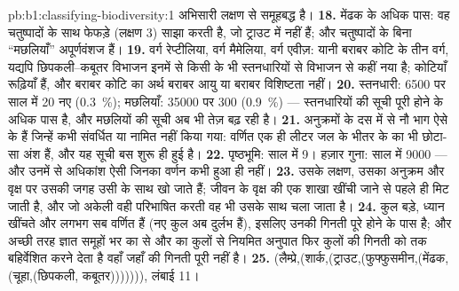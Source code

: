 \begin{solution}{pb:b1:classifying-biodiversity:1}
अभिसारी लक्षण से समूहबद्ध है।
\textbf{18.} मेंढक के अधिक पास: वह चतुष्पादों के साथ फेफड़े (लक्षण 3)
साझा करती है, जो ट्राउट में नहीं हैं; और चतुष्पादों के बिना ``मछलियाँ''
अपूर्णवंशज हैं।
\textbf{19.} वर्ग रेप्टीलिया, वर्ग मैमेलिया, वर्ग एवीज़: यानी बराबर कोटि
के तीन वर्ग, यद्यपि छिपकली--कबूतर विभाजन इनमें से किसी के भी स्तनधारियों
से विभाजन से कहीं नया है; कोटियाँ रूढ़ियाँ हैं, और
बराबर कोटि का अर्थ बराबर आयु या बराबर विशिष्टता नहीं।
\textbf{20.} स्तनधारी: \num{6500} पर साल में \num{20} नए (\qty{0.3}{\%});
मछलियाँ: \num{35000} पर \num{300} (\qty{0.9}{\%}) --- स्तनधारियों की
सूची पूरी होने के अधिक पास है, और मछलियों की सूची अब भी तेज़
बढ़ रही है।
\textbf{21.} अनुक्रमों के दस में से नौ भाग ऐसे  के हैं जिन्हें कभी
संवर्धित या नामित नहीं किया गया: वर्णित  एक ही लीटर जल के
भीतर के  का भी छोटा-सा अंश हैं, और यह सूची बस शुरू ही हुई है।
\textbf{22.} पृष्ठभूमि: साल में \num{9}। हज़ार गुना: साल में \num{9000}
--- और उनमें से अधिकांश ऐसी  जिनका वर्णन कभी हुआ ही नहीं।
\textbf{23.} उसके लक्षण, उसका अनुक्रम और वृक्ष पर उसकी जगह उसी के साथ
खो जाते हैं; जीवन के वृक्ष की एक शाखा खींची जाने से पहले ही मिट जाती है,
और जो  अकेली वही परिभाषित करती वह भी उसके साथ चला जाता है।
\textbf{24.} कुल बड़े, ध्यान खींचते और लगभग सब वर्णित हैं
(नए कुल अब दुर्लभ हैं), इसलिए उनकी गिनती पूरे होने के पास है;
और अच्छी तरह ज्ञात समूहों भर  का  से और  का कुलों से
नियमित अनुपात फिर कुलों की गिनती को  तक बहिर्वेशित करने देता है
वहाँ जहाँ  की गिनती पूरी नहीं है।
\textbf{25.} (लैम्प्रे,(शार्क,(ट्राउट,(फुफ्फुसमीन,(मेंढक,(चूहा,(छिपकली,
कबूतर))))))), लंबाई \num{11}।
\end{solution}
